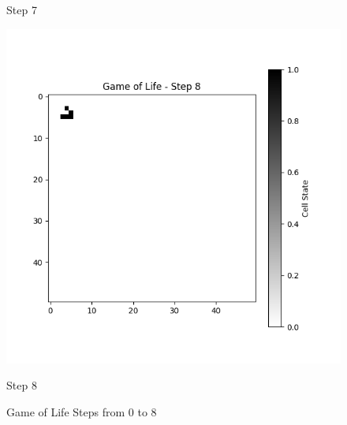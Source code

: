 \documentclass[10pt,letterpaper, onecolumn]{report}
\begin{document}
\begin{flushleft}
\begin{flushleft}
\begin{figure}[htbp!]
\begin{minipage}{0.3\textwidth}
                            \caption{Step 7}
                        \end{minipage}%
                        \begin{minipage}{0.3\textwidth}
                            \centering
                            \includegraphics[width=\textwidth]{../game_of_life_step_Game of Life - Step 8}
                            \caption{Step 8}
                        \end{minipage}
                        \caption{Game of Life Steps from 0 to 8}
                    \end{figure}
                    

    \end{flushleft}

\end{flushleft}
\end{document}

